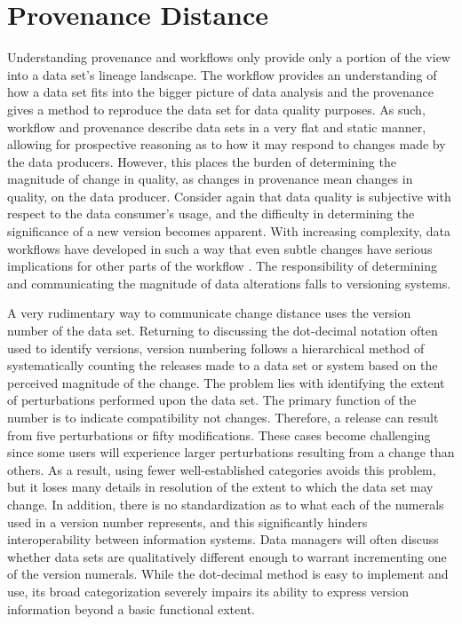 \section{Provenance Distance}

Understanding provenance and workflows only provide only a portion of the view into a data set's lineage landscape.
The workflow provides an understanding of how a data set fits into the bigger picture of data analysis and the provenance gives a method to reproduce the data set for data quality purposes.
As such, workflow and provenance describe data sets in a very flat and static manner, allowing for prospective reasoning as to how it may respond to changes made by the data producers.
However, this places the burden of determining the magnitude of change in quality, as changes in provenance mean changes in quality, on the data producer.
Consider again that data quality is subjective with respect to the data consumer's usage, and the difficulty in determining the significance of a new version becomes apparent.
With increasing complexity, data workflows have developed in such a way that even subtle changes have serious implications for other parts of the workflow \cite{TILMES2011548}.
The responsibility of determining and communicating the magnitude of data alterations falls to versioning systems.

A very rudimentary way to communicate change distance uses the version number of the data set.
Returning to discussing the dot-decimal notation often used to identify versions, version numbering follows a hierarchical method of systematically counting the releases made to a data set or system based on the perceived magnitude of the change.
The problem lies with identifying the extent of perturbations performed upon the data set.
The primary function of the number is to indicate compatibility not changes.
Therefore, a release can result from five perturbations or fifty modifications.
These cases become challenging since some users will experience larger perturbations resulting from a change than others.
As a result, using fewer well-established categories avoids this problem, but it loses many details in resolution of the extent to which the data set may change.
In addition, there is no standardization as to what each of the numerals used in a version number represents, and this significantly hinders interoperability between information systems.
Data managers will often discuss whether data sets are qualitatively different enough to warrant incrementing one of the version numerals.
While the dot-decimal method is easy to implement and use, its broad categorization severely impairs its ability to express version information beyond a basic functional extent.

